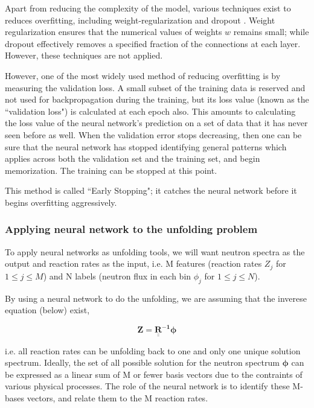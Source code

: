 \documentclass[a4paper, 12pt]{article}
\newcommand{\ve}[1]{\boldsymbol{#1}}
\begin{document}
    Apart from reducing the complexity of the model, various techniques exist to reduces overfitting, including weight-regularization and dropout \cite{TensorflowOverfitting}. Weight regularization ensures that the numerical values of weights $w$ remains small; while dropout effectively removes a specified fraction of the connections at each layer. However, these techniques are not applied.

    However, one of the most widely used method of reducing overfitting is by measuring the validation loss. A small subset of the training data is reserved and not used for backpropagation during the training, but its loss value (known as the ``validation loss") is calculated at each epoch also. This amounts to calculating the loss value of the neural network's prediction on a set of data that it has never seen before as well. When the validation error stops decreasing, then one can be sure that the neural network has stopped identifying general patterns which applies across both the validation set and the training set, and begin memorization. The training can be stopped at this point.

    This method is called ``Early Stopping"; it catches the neural network before it begins overfitting aggressively.

\subsubsection{Applying neural network to the unfolding problem}
    To apply neural networks as unfolding tools, we will want neutron spectra as the output and reaction rates as the input, i.e. M features (reaction rates $Z_j$ for $1\le j\le M$) and N labels (neutron flux in each bin $\phi_j$ for $1 \le j \le N$).

    By using a neural network to do the unfolding, we are assuming that the inverese equation (below) exist,

    \begin{equation} \label{unfolding inverse equation}
        \ve{Z} = \mathbf{\underline{\underline{R}}^{-1}} \ve{\phi}
    \end{equation}
    
    i.e. all reaction rates can be unfolding back to one and only one unique solution spectrum. Ideally, the set of all possible solution for the neutron spectrum $\ve{\phi}$ can be expressed as a linear sum of M or fewer basis vectors due to the contraints of various physical processes. The role of the neural network is to identify these M- bases vectors, and relate them to the M reaction rates.
\end{document}

